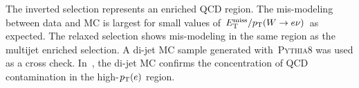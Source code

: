 \clearpage
The inverted \MET selection represents an enriched QCD region. The mis-modeling between data and MC is largest for small values of $E_{\text{T}}^{\text{miss}}/p_{\text{T}}(W\rightarrow e\nu)$ as expected. The relaxed \MET selection shows mis-modeling in the same region as the multijet enriched selection. A di-jet MC sample generated with \textsc{Pythia8} was used as a cross check. In~\Fig{\ref{fig:qcdpt_el}}, the di-jet MC confirms the concentration of QCD contamination in the high-$p_{\text{T}}(e)$ region.
\begin{figure}[h!tb]
\centering
{}
\\

\end{figure}
